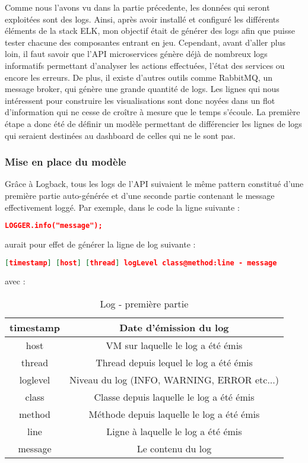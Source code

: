 	Comme nous l'avons vu dans la partie précedente, les données qui seront exploitées sont des logs. Ainsi, après avoir installé et configuré les différents éléments de la stack ELK, mon objectif était de générer des logs afin que puisse tester chacune des composantes entrant en jeu. Cependant, avant d'aller plus loin, il faut savoir que l'API microservices génère déjà de nombreux logs informatifs permettant d'analyser les actions effectuées, l'état des services ou encore les erreurs. De plus, il existe d'autres outils comme RabbitMQ, un message broker, qui génère une grande quantité de logs. Les lignes qui nous intéressent pour construire les visualisations sont donc noyées dans un flot d'information qui ne cesse de croître à mesure que le temps s'écoule. La première étape a donc été de définir un modèle permettant de différencier les lignes de logs qui seraient destinées au dashboard de celles qui ne le sont pas. \\
	
	\subsubsection{Mise en place du modèle}
	
	Grâce à Logback, tous les logs de l'API suivaient le même pattern constitué d'une première partie auto-générée et d'une seconde partie contenant le message effectivement loggé. Par exemple, dans le code la ligne suivante :

\begin{lstlisting}[language=json]
 LOGGER.info("message");
\end{lstlisting}	

 aurait pour effet de générer la ligne de log suivante :

\begin{lstlisting}[language=json]
 [timestamp] [host] [thread] logLevel class@method:line - message
\end{lstlisting}

avec :

\begin{table}[h!]
	\center
	\begin{tabular}{| c | c |}
     \hline
     timestamp & Date d'émission du log \\ \hline
     host & VM sur laquelle le log a été émis \\ \hline
     thread & Thread depuis lequel le log a été émis \\ \hline
     loglevel & Niveau du log (INFO, WARNING, ERROR etc...) \\ \hline
     class & Classe depuis laquelle le log a été émis \\ \hline
     method & Méthode depuis laquelle le log a été émis \\ \hline
     line & Ligne à laquelle le log a été émis \\ \hline
     message & Le contenu du log \\
     \hline
	\end{tabular}
	\caption{Log - première partie}
	\end{table}
	
